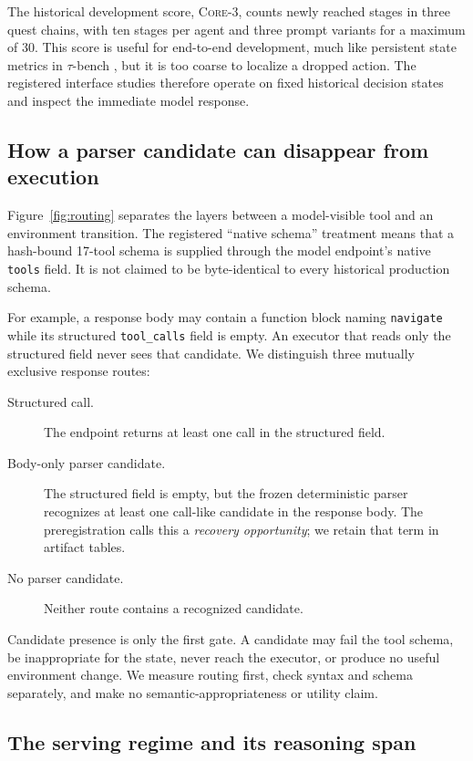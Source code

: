 \documentclass[10pt]{article}
\newcommand{\core}{\textsc{Core-3}}
\begin{document}
The historical development score, \core{}, counts newly reached stages in
three quest chains, with ten stages per agent and three prompt variants for a
maximum of 30. This score is useful for end-to-end development, much like
persistent state metrics in $\tau$-bench \citep{yao2025taubench}, but it is too
coarse to localize a dropped action. The registered interface studies therefore
operate on fixed historical decision states and inspect the immediate model
response.

\subsection{How a parser candidate can disappear from execution}

Figure~\ref{fig:routing} separates the layers between a model-visible tool and
an environment transition. The registered ``native schema'' treatment means
that a hash-bound 17-tool schema is supplied through the model endpoint's
native \texttt{tools} field. It is not claimed to be byte-identical to every
historical production schema.

For example, a response body may contain a function block naming
\texttt{navigate} while its structured \texttt{tool\_calls} field is empty.
An executor that reads only the structured field never sees that candidate.
We distinguish three mutually exclusive response routes:

\begin{description}
  \item[Structured call.] The endpoint returns at least one call in the
  structured field.
  \item[Body-only parser candidate.] The structured field is empty, but the
  frozen deterministic parser recognizes at least one call-like candidate in
  the response body. The preregistration calls this a \emph{recovery
  opportunity}; we retain that term in artifact tables.
  \item[No parser candidate.] Neither route contains a recognized candidate.
\end{description}

Candidate presence is only the first gate. A candidate may fail the tool
schema, be inappropriate for the state, never reach the executor, or produce no
useful environment change. We measure routing first, check syntax and schema
separately, and make no semantic-appropriateness or utility claim.

\subsection{The serving regime and its reasoning span}
\label{sec:reasoning-regime}
\end{document}
